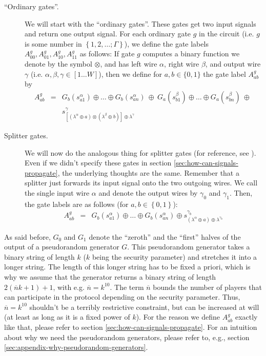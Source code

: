 \begin{description}
\item[``Ordinary gates''.] We will start with the ``ordinary gates''. These gates get two input signals and return one output signal. For each ordinary gate $g$ in the circuit (i.e. $g$ is some number in $\left\{ 1,2,\dots;\Gamma \right\}$), we define the gate labels $A^g_{00}, A^g_{01}, A^g_{10}, A^g_{11}$ as follows: If gate $g$ computes a binary function we denote by the symbol $\otimes$, and has left wire $\alpha$, right wire $\beta$, and output wire $\gamma$ (i.e. $\alpha,\beta,\gamma\in[1\dots W]$), then we define for $a,b\in\{0,1\}$ the gate label $A_{ab}^g$ by
  \begin{eqnarray}
    \label{eqn:gate-labels-definition}
    A_{ab}^g &= & G_b(s_{a1}^\alpha)\oplus\dots\oplus G_b(s_{an}^\alpha) 
              \ \oplus \ 
              G_a(s_{b1}^\beta)\oplus\dots\oplus G_a(s_{bn}^\beta)
              \ \oplus \ \\ \nonumber
             & & s_{[(\lambda^\alpha\oplus a)\otimes(\lambda^\beta\oplus b)]\oplus\lambda^\gamma}^\gamma
  \end{eqnarray}
\item[Splitter gates.] We will now do the analogous thing for splitter gates (for reference, see \cite{Xu:2004:MAS:1023552}). Even if we didn't specify these gates in section \ref{sec:how-can-signals-propagate}, the underlying thoughts are the same. Remember that a splitter just forwards its input signal onto the two outgoing wires. We call the single input wire $\alpha$ and denote the output wires by $\gamma_0$ and $\gamma_1$. Then, the gate labels are as follows (for $a,b\in\left\{ 0,1 \right\}$):
  \begin{eqnarray*}
    A_{ab}^g & = & G_b(s^\alpha_{a1}) \oplus \dots \oplus G_b(s^\alpha_{an}) \oplus s^{\gamma_b}_{(\lambda^\alpha\oplus a)\oplus\lambda^{\gamma_b}}
  \end{eqnarray*}
\end{description}

As said before, $G_0$ and $G_1$ denote the ``zeroth'' and the ``first'' halves of the output of a pseudorandom generator $G$. This pseudorandom generator takes a binary string of length $k$ ($k$ being the security parameter) and stretches it into a longer string. The length of this longer string has to be fixed a priori, which is why we assume that the generator returns a binary string of length $2(\overline{n}k+1)+1$, with e.g. $\overline{n}=k^{10}$. The term $\overline{n}$ bounds the number of players that can participate in the protocol depending on the security parameter. Thus, $\overline{n}=k^{10}$ shouldn't be a terribly restrictive constraint, but can be increased at will (at least as long as it is a fixed power of $k$). For the reason we define $A^g_{ab}$ exactly like that, please refer to section \ref{sec:how-can-signals-propagate}. For an intuition about why we need the pseudorandom generators, please refer to, e.g., section \ref{sec:appendix-why-pseudorandom-generators}.

